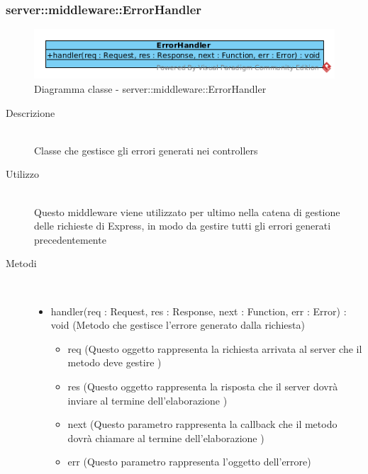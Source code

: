 \subsubsection[ErrorHandler]{server::middleware::ErrorHandler}
\begin{center}
			\begin{figure}[H]
				\centering \includegraphics[scale=4, max width=\textwidth, max height=\myheight]{../img/diagrammiClassi/server/middleware/ErrorHandler.png}
				\caption{Diagramma classe - server::middleware::ErrorHandler}
			\end{figure}
		\end{center}\begin{description}
\item[Descrizione] \hfill \\
 Classe che gestisce gli errori generati nei controllers 
\item[Utilizzo] \hfill \\
 Questo middleware viene utilizzato per ultimo nella catena di gestione delle richieste di Express, in modo da gestire tutti gli errori generati precedentemente
\item[Metodi] \hfill \\
 \vspace{-7mm}
\begin{itemize}
\item handler(req : Request, res : Response, next : Function, err : Error) : void (Metodo che gestisce l'errore generato dalla richiesta)\begin{itemize}
\item req (Questo oggetto rappresenta la richiesta arrivata al server che il metodo deve gestire	)
\item res (Questo oggetto rappresenta la risposta che il server dovrà inviare al termine dell'elaborazione	)
\item next (Questo parametro rappresenta la callback che il metodo dovrà chiamare al termine dell’elaborazione	)
\item err (Questo parametro rappresenta l'oggetto  dell'errore)
\end{itemize}

\end{itemize}

\end{description}

